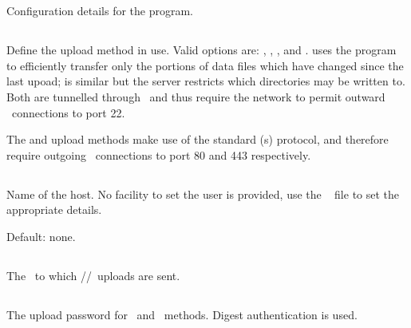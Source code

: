 
\section{\code{[upload]}}
Configuration details for the  program.

\subsection{}
Define the upload method in use. Valid options are: ,
, , and .  uses the
 program to efficiently transfer only the portions of
data files which have changed since the last upoad;  is
similar but the server restricts which directories may be written
to. Both are tunnelled through \ssh\ and thus require the network to
permit outward \tcp\ connections to port 22.

The  and  upload methods make use of the standard
\http(s) protocol, and therefore require outgoing \tcp\ connections to
port 80 and 443 respectively. 

\subsection{}
Name of the  host. No facility to set the user is
provided, use the \ssh\  file to set the
appropriate details.

Default: none.


\subsection{}
The \URL\ to which \http/\slash \https\ uploads are sent.

\subsection{}
The upload password for \http\ and \https\ methods. Digest
authentication is used.

